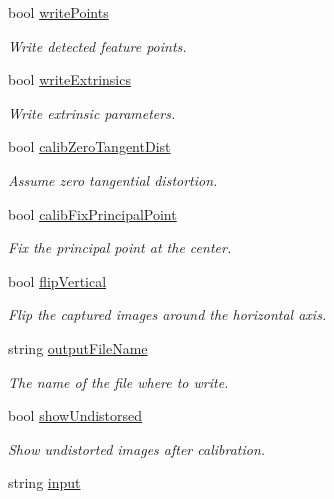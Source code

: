 \begin{DoxyCompactItemize}
bool \mbox{\hyperlink{class_cal_settings_ae02acb9427145d18a3c6a070b3cb16f9}{write\+Points}}
\begin{DoxyCompactList}\small\item\em Write detected feature points. \end{DoxyCompactList}\item 
bool \mbox{\hyperlink{class_cal_settings_a474530e6edf434e35e8b8727627e1fcb}{write\+Extrinsics}}
\begin{DoxyCompactList}\small\item\em Write extrinsic parameters. \end{DoxyCompactList}\item 
bool \mbox{\hyperlink{class_cal_settings_a77e82318d82b8325bc0d4e87d08b732c}{calib\+Zero\+Tangent\+Dist}}
\begin{DoxyCompactList}\small\item\em Assume zero tangential distortion. \end{DoxyCompactList}\item 
bool \mbox{\hyperlink{class_cal_settings_a0987198584271e224daffc66c87808d7}{calib\+Fix\+Principal\+Point}}
\begin{DoxyCompactList}\small\item\em Fix the principal point at the center. \end{DoxyCompactList}\item 
bool \mbox{\hyperlink{class_cal_settings_a9a2cff2a0d53011d5a3b1a03a7460589}{flip\+Vertical}}
\begin{DoxyCompactList}\small\item\em Flip the captured images around the horizontal axis. \end{DoxyCompactList}\item 
string \mbox{\hyperlink{class_cal_settings_a9ea48b7c35d4bba18320d3635a333936}{output\+File\+Name}}
\begin{DoxyCompactList}\small\item\em The name of the file where to write. \end{DoxyCompactList}\item 
bool \mbox{\hyperlink{class_cal_settings_a3c70a81781bda96826362983a3a78bf2}{show\+Undistorsed}}
\begin{DoxyCompactList}\small\item\em Show undistorted images after calibration. \end{DoxyCompactList}\item 
string \mbox{\hyperlink{class_cal_settings_af5c2593c9b0ede5badd13709641582c9}{input}}

\end{DoxyCompactItemize}
